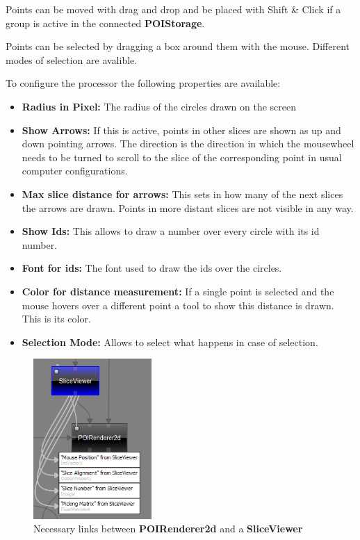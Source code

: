 \documentclass[
    fontsize=12pt,
    paper=a4,
    pagesize=auto,
    parskip=false,
    titlepage=on,
    english
]{scrartcl}
\begin{document}
Points can be moved with drag and drop and be placed with Shift \& Click if a group is active in the connected \textbf{POIStorage}.

Points can be selected by dragging a box around them with the mouse. Different modes of selection are avalible.

To configure the processor the following properties are available:
\begin{itemize}
	\item \textbf{Radius in Pixel:} The radius of the circles drawn on the screen
	\item \textbf{Show Arrows:} If this is active, points in other slices are shown as up and down pointing arrows. The direction is the direction in which the mousewheel needs to be turned to scroll to the slice of the corresponding point in usual computer configurations.
	\item \textbf{Max slice distance for arrows:} This sets in how many of the next slices the arrows are drawn. Points in more distant slices are not visible in any way.
	\item \textbf{Show Ids:} This allows to draw a number over every circle with its id number.
	\item \textbf{Font for ids:} The font used to draw the ids over the circles.
	\item \textbf{Color for distance measurement:} If a single point is selected and the mouse hovers over a different point a tool to show this distance is drawn. This is its color.
	\item \textbf{Selection Mode:} Allows to select what happens in case of selection.
	
\end{itemize}

\begin{figure}[H]
	\centering
  \includegraphics[width=0.4\textwidth]{poirenderer2d}
	\caption{Necessary links between \textbf{POIRenderer2d} and a \textbf{SliceViewer}}
	\label{fig:poirenderer2d}
\end{figure}
\end{document}

